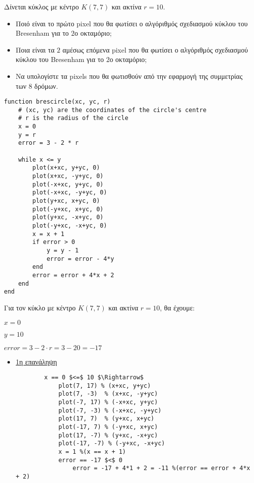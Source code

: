 \begin{exercise}
	Δίνεται κύκλος με κέντρο $Κ(7,7)$ και ακτίνα $r = 10$. 
	\begin{itemize}
	  \item Ποιό είναι το πρώτο pixel που θα φωτίσει ο αλγόριθμός σχεδιασμού κύκλου του Bresenham για το $2$ο οκταμόριο;
	  \item Ποια είναι τα $2$ αμέσως επόμενα pixel που θα φωτίσει ο αλγόριθμός σχεδιασμού κύκλου του Bresenham για το $2$ο οκταμόριο;
	  \item Να υπολογίστε  τα pixels που θα φωτισθούν από την εφαρμογή της συμμετρίας των $8$ δρόμων.
	\end{itemize}
\end{exercise}


\begin{solution}
	

\begin{lstlisting}[caption={Αλγόριθμος του Bresenham για σχεδιασμό κύκλου}]
function brescircle(xc, yc, r)
    # (xc, yc) are the coordinates of the circle's centre
    # r is the radius of the circle
    x = 0 
    y = r
    error = 3 - 2 * r
    
    while x <= y
        plot(x+xc, y+yc, 0)
        plot(x+xc, -y+yc, 0) 
        plot(-x+xc, y+yc, 0) 
        plot(-x+xc, -y+yc, 0) 
        plot(y+xc, x+yc, 0) 
        plot(-y+xc, x+yc, 0)
        plot(y+xc, -x+yc, 0) 
        plot(-y+xc, -x+yc, 0) 
        x = x + 1
        if error > 0
            y = y - 1
            error = error - 4*y
        end
        error = error + 4*x + 2
    end
end
\end{lstlisting}


Για τον κύκλο με κέντρο \( K(7, 7) \) και ακτίνα \( r = 10 \), θα έχουμε:

\begin{itemize}[noitemsep, topsep=0pt] %
\begin{multicols}{2} %
  \item \( x = 0 \)
  \item \( y = 10 \)
  \item \( error = 3 - 2 \cdot r = 3 - 20 = -17 \)
\end{multicols}
\end{itemize}


\begin{itemize}
  \item \underline{1η επανάληψη}
\lstset{style=tt}
		\begin{lstlisting}
		x == 0 $<=$ 10 $\Rightarrow$
			plot(7, 17) % (x+xc, y+yc)
			plot(7, -3)  % (x+xc, -y+yc)
			plot(-7, 17) % (-x+xc, y+yc)
			plot(-7, -3) % (-x+xc, -y+yc)
			plot(17, 7)  % (y+xc, x+yc)
			plot(-17, 7) % (-y+xc, x+yc)
			plot(17, -7) % (y+xc, -x+yc)
			plot(-17, -7) % (-y+xc, -x+yc)
			x = 1 %(x == x + 1)
			error == -17 $<$ 0 
				error = -17 + 4*1 + 2 = -11 %(error == error + 4*x + 2)
		\end{lstlisting}


\end{itemize}
\end{solution}
